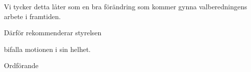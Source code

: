 \documentclass[../_main/handlingar.tex]{subfiles}
\begin{document}
\motionssvar


Vi tycker detta låter som en bra förändring som kommer gynna valberedningens arbete i framtiden. 


Därför rekommenderar styrelsen
\begin{attsatser}
    \att bifalla motionen i sin helhet.
\end{attsatser}

\begin{signatures}{1}
    \ist
    \signature{\ordf}{Ordförande}
\end{signatures}
\end{document}

